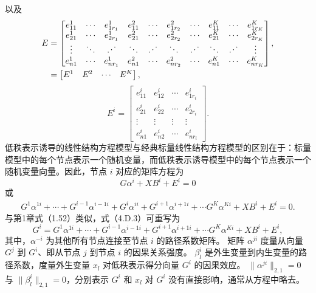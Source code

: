 以及
\[
\begin{aligned}
E&=\begin{bmatrix}
e_{11}^1&\cdots&e_{1r_1}^1&e_{11}^2&\cdots&e_{1r_2}^2&\cdots&e_{11}^K&\cdots&e_{1r_K}^K\\
e_{21}^1&\cdots&e_{2r_1}^1&e_{21}^2&\cdots&e_{2r_2}^2&\cdots&e_{21}^K&\cdots&e_{2r_K}^K\\
\vdots&\ddots&\chFourBIddots&\ddots&\chFourBIddots&\ddots&\chFourBIddots&\ddots&\chFourBIddots&\vdots\\
e_{n1}^1&\cdots&e_{nr_1}^1&e_{n1}^2&\cdots&e_{nr_2}^2&\cdots&e_{n1}^K&\cdots&e_{nr_K}^K
\end{bmatrix},\\
&=\begin{bmatrix}E^1&E^2&\cdots&E^K\end{bmatrix},
\end{aligned}
\]
\[
E^i=\begin{bmatrix}
e_{11}^i&e_{12}^i&\cdots&e_{1r_i}^i\\
e_{21}^i&e_{22}^i&\cdots&e_{2r_i}^i\\
\vdots&\vdots&\vdots&\vdots\\
e_{n1}^i&e_{n2}^i&\cdots&e_{nr_i}^i
\end{bmatrix}.
\]
低秩表示诱导的线性结构方程模型与经典标量线性结构方程模型的区别在于：标量模型中的每个节点表示一个随机变量，而低秩表示诱导模型中的每个节点表示一个随机变量向量。因此，节点 $i$ 对应的矩阵方程为
\begin{equation}
G\alpha^i+XB^i+E^i=0\tag{4.D.2}
\end{equation}
或
\begin{equation}
\begin{aligned}
G^1\alpha^{1i}+\cdots+G^{i-1}\alpha^{i-1i}
+G^i\alpha^{ii}+G^{i+1}\alpha^{i+1i}
+\cdots G^K\alpha^{Ki}+XB^i+E^i=0.
\end{aligned}\tag{4.D.3}
\end{equation}
与第1章式（1.52）类似，式（4.D.3）可重写为
\begin{equation}
G^i=G^1\alpha^{1i}+\cdots+G^{i-1}\alpha^{i-1i}
+G^{i+1}\alpha^{i+1i}+\cdots G^K\alpha^{Ki}+XB^i+E^i,\tag{4.D.4}
\end{equation}
其中，$\alpha^{-i}$ 为其他所有节点连接至节点 $i$ 的路径系数矩阵。
矩阵 $\alpha^{ji}$ 度量从向量 $G^j$ 到 $G^i$、即从节点 $j$ 到节点 $i$ 的因果关系强度。
$\beta_l^i$ 是外生变量到内生变量的路径系数，度量外生变量 $x_l$ 对低秩表示得分向量 $G^i$ 的因果效应。
$\|\alpha^{ji}\|_{2,1}=0$ 与 $\|\beta_l^i\|_{2,1}=0$，分别表示 $G^i$ 和 $x_l$ 对 $G^i$ 没有直接影响，通常从方程中略去。


